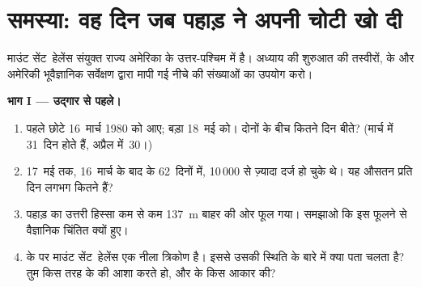 \section{समस्या: वह दिन जब पहाड़ ने अपनी चोटी खो दी}

\begin{problem}[{सप्ताहांत समस्या --- माउंट सेंट~हेलेंस के चेतावनी संकेत,
18~मई 1980 का उद्गार, और पहाड़ का कितना हिस्सा ग़ायब हो गया}]
\label{pb:g7:volcanoes:1}

माउंट सेंट~हेलेंस संयुक्त राज्य अमेरिका के उत्तर-पश्चिम में है। अध्याय की शुरुआत
की तस्वीरों,  के  और अमेरिकी भूवैज्ञानिक सर्वेक्षण द्वारा मापी
गई नीचे की संख्याओं का उपयोग करो।

\medskip
\noindent\textbf{भाग I --- उद्गार से पहले।}
\begin{enumerate}
  \item पहले छोटे  16~मार्च 1980 को आए; बड़ा  18~मई को। दोनों के बीच
        कितने दिन बीते? (मार्च में 31~दिन होते हैं, अप्रैल
        में~30।)
  \item 17~मई तक, 16~मार्च के बाद के 62~दिनों में, 10\,000 से ज़्यादा 
        दर्ज हो चुके थे। यह औसतन प्रति दिन लगभग कितने
        हैं?
  \item पहाड़ का उत्तरी हिस्सा कम से कम \qty{137}{m} बाहर की ओर फूल गया। समझाओ
        कि इस फूलने से वैज्ञानिक चिंतित क्यों हुए।
  \item {} के  पर माउंट सेंट~हेलेंस एक नीला त्रिकोण है। इससे
        उसकी स्थिति के बारे में क्या पता चलता है? तुम किस तरह के  की आशा
        करते हो, और  के किस आकार की?
\end{enumerate}


\end{problem}

